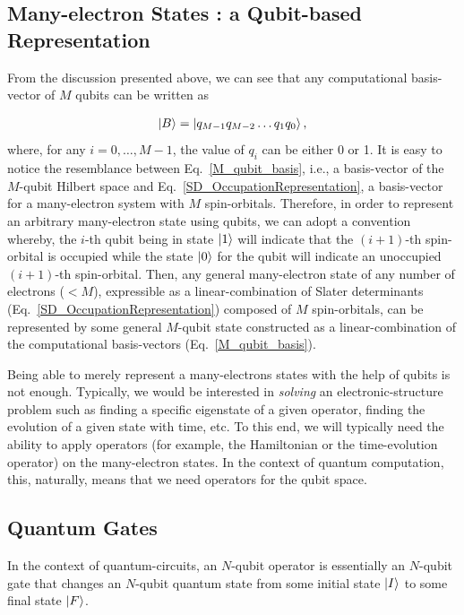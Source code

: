 \documentclass[12pt,oneside]{book}
\begin{document}
\subsection*{Many-electron States : a Qubit-based Representation}

From the discussion presented above, we can see that any computational basis-vector of $M$ qubits can be written as

\begin{align}\label{M_qubit_basis}
    \ket{B} = \ket{q_{M-1}q_{M-2}\hdots q_1 q_0},
\end{align}
where, for any $i=0,\hdots,M-1$, the value of $q_i$ can be either 0 or 1. It is easy to notice the resemblance between Eq.~\ref{M_qubit_basis}, i.e., a basis-vector of the $M$-qubit Hilbert space and Eq.~\ref{SD_OccupationRepresentation}, a basis-vector for a many-electron system with $M$ spin-orbitals. Therefore, in order to represent an arbitrary many-electron state using qubits, we can adopt a convention whereby, the $i$-th qubit being in state $\ket{1}$ will indicate that the $(i+1)$-th spin-orbital is occupied while the state $\ket{0}$ for the qubit will indicate an unoccupied $(i+1)$-th spin-orbital. Then, any general many-electron state of any number of electrons ($<M$), expressible as a linear-combination of Slater determinants (Eq.~\ref{SD_OccupationRepresentation}) composed of $M$ spin-orbitals, can be represented by some general $M$-qubit state constructed as a linear-combination of the computational basis-vectors (Eq.~\ref{M_qubit_basis}).  

Being able to merely represent a many-electrons states with the help of qubits is not enough. Typically, we would be interested in \textit{solving} an electronic-structure problem such as finding a specific eigenstate of a given operator, finding the evolution of a given state with time, etc. To this end, we will typically need the ability to apply operators (for example, the Hamiltonian or the time-evolution operator) on the many-electron states. In the context of quantum computation, this, naturally, means that we need operators for the qubit space. 

\subsection*{Quantum Gates}

In the context of quantum-circuits, an $N$-qubit operator is essentially an $N$-qubit gate that changes an $N$-qubit quantum state from some initial state $\ket{I}$ to some final state $\ket{F}$.
\end{document}
